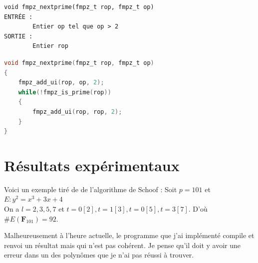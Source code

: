 \documentclass{article}%
\theoremstyle{plain}
\theoremstyle{definition}
\theoremstyle{plain}
\theoremstyle{plain}
\theoremstyle{remark}
\begin{document}
\begin{verbatim}
void fmpz_nextprime(fmpz_t rop, fmpz_t op)
ENTRÉE :
    	Entier op tel que op > 2
SORTIE :
    	Entier rop
\end{verbatim} 
\begin{lstlisting}[language=c]
void fmpz_nextprime(fmpz_t rop, fmpz_t op)
{
    fmpz_add_ui(rop, op, 2);
    while(!fmpz_is_prime(rop))
    {
        fmpz_add_ui(rop, rop, 2);
    }
}
\end{lstlisting}

\section{Résultats expérimentaux}


Voici un exemple tiré de \cite{ref2} de l'algorithme de Schoof : Soit $p=101$ et $E : y^{2} = x^{3} + 3x + 4$\\
On a $l = 2, 3, 5, 7$ et $t=0[2], t=1[3], t=0[5], t=3[7]$.
D'où $\#E(\mathbf{F}_{101}) = 92$.

Malheureusement à l'heure actuelle, le programme que j'ai implémenté compile et renvoi un résultat mais qui n'est pas cohérent.
Je pense qu'il doit y avoir une erreur dans un des polynômes que je n'ai pas réussi à trouver.

\clearpage 
\nocite{*} 


\end{document}
